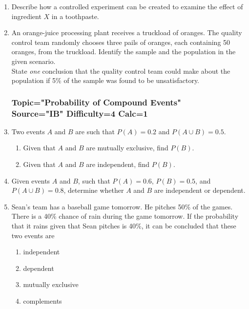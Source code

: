 \documentclass[12pt, oneside]{article}
\begin{document}
\begin{enumerate}
\item Describe how a controlled experiment can be created to examine the effect of ingredient $X$ in a toothpaste. %

\item An orange-juice processing plant receives a truckload of oranges. The quality control team randomly chooses three pails of oranges, each containing 50 oranges, from the truckload. Identify the sample and the population in the given scenario.\\[1.5in]
State \emph{one} conclusion that the quality control team could make about the population if 5\% of the sample was found to be unsatisfactory. %

\subsubsection*{Topic="Probability of Compound Events"\\
Source="IB" 
Difficulty=4 
Calc=1}

\item Two events $A$ and $B$ are such that $P(A)=0.2$ and $P(A \cup B) =0.5$. 
\begin{enumerate}
    \item Given that $A$ and $B$ are mutually exclusive, find $P(B)$.
    \item Given that $A$ and $B$ are independent, find $P(B)$.
\end{enumerate}

\item Given events $A$ and $B$, such that $P(A)= 0.6$, $P(B) = 0.5$, and $P(A \cup B)=0.8$, determine whether $A$ and $B$ are independent or dependent. %

\item Sean’s team has a baseball game tomorrow. He pitches 50\% of the games. There is a 40\% chance of rain during the game tomorrow. If the probability that it rains given that Sean pitches is 40\%, it can be concluded that these two events are
\begin{enumerate}
    \item independent
    \item dependent
    \item mutually exclusive
    \item complements
\end{enumerate} %


\end{enumerate}
\end{document}
